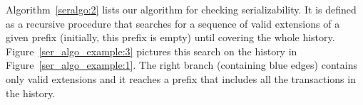 Algorithm~\ref{seralgo:2} lists our algorithm for checking serializability. It is defined as a recursive procedure that searches for a sequence of valid extensions of a given prefix (initially, this prefix is empty) until covering the whole history. Figure~\ref{ser_algo_example:3} pictures this search on the history in Figure~\ref{ser_algo_example:1}. The right branch (containing blue edges) contains only valid extensions and it reaches a prefix that includes all the transactions in the history.




